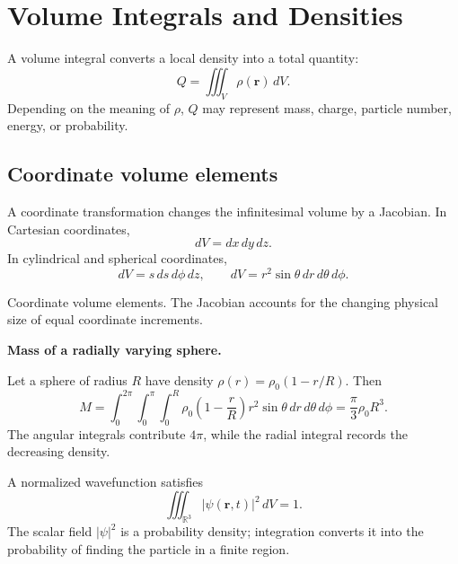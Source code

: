 \section{Volume Integrals and Densities}
\label{sec:volume-integrals}

A volume integral converts a local density into a total quantity:
\[
\boxed{Q=\iiint_V\rho(\mathbf r)\,dV.}
\]
Depending on the meaning of $\rho$, $Q$ may represent mass, charge, particle number, energy, or probability.

\subsection{Coordinate volume elements}
A coordinate transformation changes the infinitesimal volume by a Jacobian. In Cartesian coordinates,
\[
dV=dx\,dy\,dz.
\]
In cylindrical and spherical coordinates,
\[
\boxed{dV=s\,ds\,d\phi\,dz,}
\qquad
\boxed{dV=r^2\sin\theta\,dr\,d\theta\,d\phi.}
\]

\begin{bookfigure}{Coordinate volume elements. The Jacobian accounts for the changing physical size of equal coordinate increments.}

\label{fig:volume-elements}
\end{bookfigure}

\begin{workedexample}
\textbf{Mass of a radially varying sphere.}\par
Let a sphere of radius $R$ have density $\rho(r)=\rho_0(1-r/R)$. Then
\[
M=\int_0^{2\pi}\!\int_0^\pi\!\int_0^R
\rho_0\left(1-\frac rR\right)r^2\sin\theta\,dr\,d\theta\,d\phi
=\frac{\pi}{3}\rho_0R^3.
\]
The angular integrals contribute $4\pi$, while the radial integral records the decreasing density.
\end{workedexample}

\begin{keyidea}
A normalized wavefunction satisfies
\[
\iiint_{\mathbb R^3}|\psi(\mathbf r,t)|^2\,dV=1.
\]
The scalar field $|\psi|^2$ is a probability density; integration converts it into the probability of finding the particle in a finite region.
\end{keyidea}
